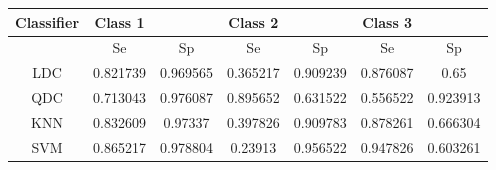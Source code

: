 \begin{tabular}{|c|c|c|c|c|c|c|}
 \hline 
Classifier & Class 1 &  & Class 2 &  & Class 3 &  \\ 
 \hline 
 & Se & Sp & Se & Sp & Se & Sp \\ 
 \hline 
LDC & 0.821739 & 0.969565 & 0.365217 & 0.909239 & 0.876087 & 0.65 \\ 
 \hline 
QDC & 0.713043 & 0.976087 & 0.895652 & 0.631522 & 0.556522 & 0.923913 \\ 
 \hline 
KNN & 0.832609 & 0.97337 & 0.397826 & 0.909783 & 0.878261 & 0.666304 \\ 
 \hline 
SVM & 0.865217 & 0.978804 & 0.23913 & 0.956522 & 0.947826 & 0.603261 \\ 
 \hline 
\end{tabular}